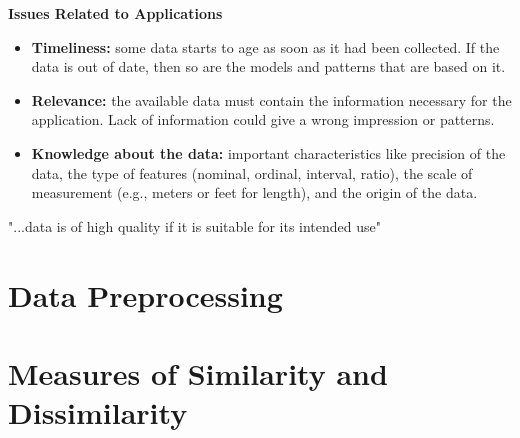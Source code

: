 	{\bf Issues Related to Applications}
		\begin{itemize}
			\item {\bf Timeliness:} some data starts to age as soon as it had been 
			collected. If the data is out of date, then so are the models and patterns
			that are based on it. 
			\item {\bf Relevance:} the available data must contain the information necessary
			for the application. Lack of information could give a wrong impression or patterns.
			\item {\bf Knowledge about the data:} important characteristics like precision of the
			data, the type of features (nominal, ordinal, interval, ratio), the scale of 
			measurement (e.g., meters or feet for length), and the origin of the data.
		\end{itemize}

		\vspace{1cm}

		{\LARGE "...data is of high quality if it is suitable for its intended use"}



\section{Data Preprocessing}

\section{Measures of Similarity and Dissimilarity}




